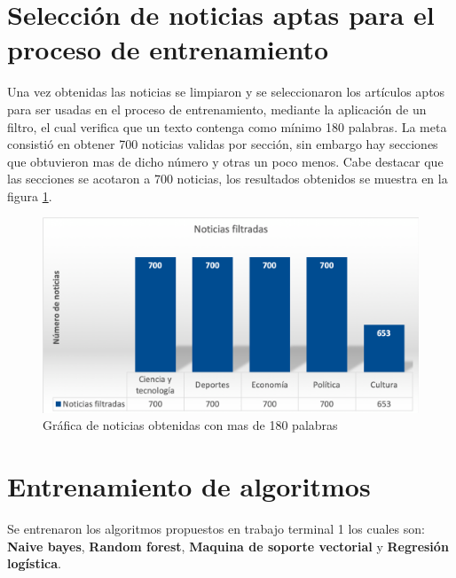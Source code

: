 \section{Selección de noticias aptas para el proceso de entrenamiento}

Una vez obtenidas las noticias se limpiaron y se seleccionaron los artículos aptos para ser usadas en el proceso de entrenamiento, mediante la aplicación de un filtro, el cual verifica que un texto contenga como mínimo 180 palabras. La meta consistió en obtener 700 noticias validas por sección, sin embargo hay secciones que obtuvieron mas de dicho número  y otras un poco menos. Cabe destacar que las secciones se  acotaron a 700 noticias, los resultados obtenidos se muestra en la figura \ref{fig:filtro}. 


\begin{figure}[ht]
\centering
\includegraphics[scale=0.4]{imagenes/Resultados/Filtrado.png}
\caption{Gráfica de noticias obtenidas con mas de 180 palabras}
\label{fig:filtro}
\end{figure}

\section{Entrenamiento de algoritmos}

Se entrenaron los algoritmos propuestos en trabajo terminal 1 los cuales son: \textbf{Naive bayes}, \textbf{Random forest}, \textbf{Maquina de soporte vectorial} y \textbf{Regresión logística}.\\


